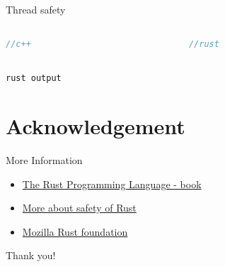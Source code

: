 \documentclass[10pt]{beamer}
\begin{document}
\begin{frame}[fragile]{Thread safety}
	\begin{columns}
        \begin{column}{0.5\textwidth}
            \begin{lstlisting}[language=c++]
            //c++
            \end{lstlisting}
        \end{column}
        
        \vrule{}
        \begin{column}{0.5\textwidth}
            \begin{lstlisting}[language=rust]
            //rust
            \end{lstlisting}
        
        \end{column}
    \end{columns}
    \texttt{rust output}
\end{frame}


\section*{Acknowledgement}  

    \begin{frame}{More Information}
        \begin{itemize}
            \item \href{https://doc.rust-lang.org/book/}{The Rust Programming Language - book}
            \item \href{https://developer.okta.com/blog/2022/03/18/programming-security-and-why-rust}{More about safety of Rust}
            \item \href{https://blog.mozilla.org/en/mozilla/mozilla-welcomes-the-rust-foundation/}{Mozilla Rust foundation}
        \end{itemize}
    \end{frame}

    \begin{frame}
    \textcolor{myNewColorA}{\Huge{\centerline{Thank you!}}}
    \end{frame}
\end{document}
